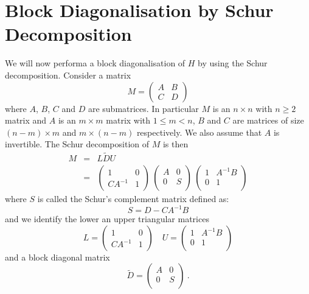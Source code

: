 \documentclass[12pt]{article}
\begin{document}
\section{Block Diagonalisation by Schur Decomposition}
We will now performa a block diagonalisation of $H$ by using the Schur decomposition. Consider a matrix 
\begin{equation}
M = 
\left( \begin{array}{cc}
A & B \\
C & D 
\end{array}
\right)
\end{equation}
where $A$, $B$, $C$ and $D$ are submatrices. In particular $M$ is an $n \times n$ with $n \ge 2$ matrix and $A$ is an $ m \times m$ matrix with $1 \le m < n$, 
$B$ and $C$ are matrices of size $(n-m) \times m$ and $m \times (n-m)$ respectively. We also assume that $A$ is invertible. The Schur decomposition of $M$ is then 
\begin{eqnarray}
M &=& L \tilde{D} U \\
  &=& \left( 
\begin{array}{cc}
 1 & 0 \\
C A^{-1} & 1 
\end{array} \right)
\ \left( \begin{array}{cc}
  A & 0 \\
  0 & S \\
\end{array} \right) 
\ \left( \begin{array}{cc}
  1 & A^{-1} B \\
  0 &  1  \\
\end{array} \right)
\end{eqnarray}
where $S$ is called the Schur's complement matrix defined as:
\begin{equation}
S = D - C A^{-1} B
\end{equation}
and we identify the lower an upper triangular matrices
\begin{equation} \label{eq:LDU1}
L = \left( 
\begin{array}{cc}
 1 & 0 \\
C A^{-1} & 1 
\end{array} \right) \quad
U =  \left( \begin{array}{cc}
  1 & A^{-1} B \\
  0 &  1  \\
\end{array} \right)
\end{equation}
and a block diagonal matrix
\begin{equation} \label{eq:LDU2}
\tilde{D} = \left( \begin{array}{cc}
  A & 0 \\
  0 & S \\
\end{array} \right) \ .
\end{equation}
\end{document}
